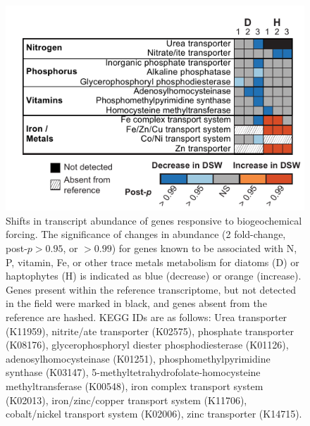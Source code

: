 \begin{figure}[h!]
  \centering
    \includegraphics[width=.8\textwidth]{Images/C4_Figure3_Final.pdf}
    \caption[Shifts in transcript abundance of genes responsive to biogeochemical forcing]{Shifts in transcript abundance of genes responsive to biogeochemical forcing. The significance of changes in abundance (2 fold-change, post-$p > 0.95$, or $>0.99$) for genes known to be associated with N, P, vitamin, Fe, or other trace metals metabolism for diatoms (D) or haptophytes (H) is indicated as blue (decrease) or orange (increase). Genes present within the reference transcriptome, but not detected in the field were marked in black, and genes absent from the reference are hashed. KEGG IDs are as follows: Urea transporter (K11959), nitrite/ate transporter (K02575), phosphate transporter (K08176), glycerophosphoryl diester phosphodiesterase (K01126), adenosylhomocysteinase (K01251), phosphomethylpyrimidine synthase (K03147), 5-methyltetrahydrofolate-homocysteine methyltransferase (K00548), iron complex transport system (K02013), iron/zinc/copper transport system (K11706), cobalt/nickel transport system (K02006), zinc transporter (K14715).}
  \label{fig:c4f3}
\end{figure}


